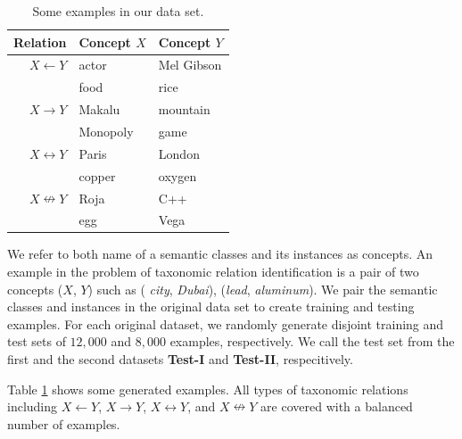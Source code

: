 \begin{table}[!t]
  \small
  \centering
  \begin{tabular}{r|l|l}
    Relation          & Concept $X$ & Concept $Y$    \\
    \hline
    $X \leftarrow Y$        & actor             & Mel Gibson           \\
    & food              & rice                 \\
    \hline                               
    $X \rightarrow Y$       & Makalu            & mountain             \\
    & Monopoly          & game                 \\
    \hline                               
    $X \leftrightarrow Y$   & Paris             & London               \\
    & copper            & oxygen                \\
    \hline                               
    $X \nleftrightarrow Y$ & Roja              & C++                  \\
    & egg               & Vega                  \\
  \end{tabular}
  \caption{Some examples in our data set.}
  \label{table:examples}
\end{table}


We refer to both name of a semantic classes and its instances as
concepts. An example in the problem of taxonomic relation
identification is a pair of two concepts ($X$, $Y$) such as ({\em
  city}, {\em Dubai}), ({\em lead}, {\em aluminum}). We pair the
semantic classes and instances in the original data set to create
training and testing examples. For each original dataset, we randomly
generate disjoint training and test sets of $12,000$ and $8,000$
examples, respectively. We call the test set from the first and the
second datasets {\bf Test-I} and {\bf Test-II},
respecitively.  Table
\ref{table:examples} shows some generated examples. All types of
taxonomic relations including $X \leftarrow Y$, $X \rightarrow Y$, $X
\leftrightarrow Y$, and $X \nleftrightarrow Y$ are covered with a
balanced number of examples.


